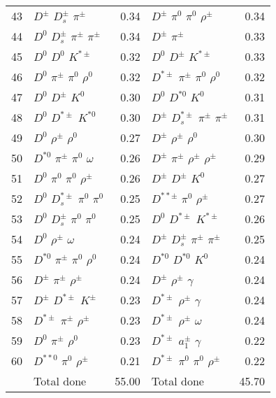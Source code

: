 \documentclass[6pt]{article}
\begin{document}
\begin{tabular}{rlr|lr}
43 & $D^{\pm}$ $D_s^{\pm}$ $\pi^{\pm}$ & 0.34 & $D^{\pm}$ $\pi^0$ $\pi^0$ $\rho^{\pm}$ & 0.34 \\
44 & $D^0$ $D_s^{\pm}$ $\pi^{\pm}$ $\pi^{\pm}$ & 0.34 & $D^{\pm}$ $\pi^{\pm}$ & 0.33 \\
45 & $D^0$ $D^0$ $K^{*\pm}$ & 0.32 & $D^0$ $D^{\pm}$ $K^{*\pm}$ & 0.33 \\
46 & $D^0$ $\pi^{\pm}$ $\pi^0$ $\rho^0$ & 0.32 & $D^{*\pm}$ $\pi^{\pm}$ $\pi^0$ $\rho^0$ & 0.32 \\
47 & $D^0$ $D^{\pm}$ $K^0$ & 0.30 & $D^0$ $D^{*0}$ $K^0$ & 0.31 \\
48 & $D^0$ $D^{*\pm}$ $K^{*0}$ & 0.30 & $D^{\pm}$ $D_s^{*\pm}$ $\pi^{\pm}$ $\pi^{\pm}$ & 0.31 \\
49 & $D^0$ $\rho^{\pm}$ $\rho^0$ & 0.27 & $D^{\pm}$ $\rho^{\pm}$ $\rho^0$ & 0.30 \\
50 & $D^{*0}$ $\pi^{\pm}$ $\pi^0$ $\omega$ & 0.26 & $D^{\pm}$ $\pi^{\pm}$ $\rho^{\pm}$ $\rho^{\pm}$ & 0.29 \\
51 & $D^0$ $\pi^0$ $\pi^0$ $\rho^{\pm}$ & 0.26 & $D^{\pm}$ $D^{\pm}$ $K^0$ & 0.27 \\
52 & $D^0$ $D_s^{*\pm}$ $\pi^0$ $\pi^0$ & 0.25 & $D^{**\pm}$ $\pi^0$ $\rho^{\pm}$ & 0.27 \\
53 & $D^0$ $D_s^{\pm}$ $\pi^0$ $\pi^0$ & 0.25 & $D^0$ $D^{*\pm}$ $K^{*\pm}$ & 0.26 \\
54 & $D^0$ $\rho^{\pm}$ $\omega$ & 0.24 & $D^{\pm}$ $D_s^{\pm}$ $\pi^{\pm}$ $\pi^{\pm}$ & 0.25 \\
55 & $D^{*0}$ $\pi^{\pm}$ $\pi^0$ $\rho^0$ & 0.24 & $D^{*0}$ $D^{*0}$ $K^0$ & 0.24 \\
56 & $D^{\pm}$ $\pi^{\pm}$ $\rho^{\pm}$ & 0.24 & $D^{\pm}$ $\rho^{\pm}$ $\gamma$ & 0.24 \\
57 & $D^{\pm}$ $D^{*\pm}$ $K^{\pm}$ & 0.23 & $D^{*\pm}$ $\rho^{\pm}$ $\gamma$ & 0.24 \\
58 & $D^{*\pm}$ $\pi^{\pm}$ $\rho^{\pm}$ & 0.23 & $D^{*\pm}$ $\rho^{\pm}$ $\omega$ & 0.24 \\
59 & $D^0$ $\pi^{\pm}$ $\rho^0$ & 0.23 & $D^{*\pm}$ $a_1^{\pm}$ $\gamma$ & 0.22 \\
60 & $D^{**0}$ $\pi^0$ $\rho^{\pm}$ & 0.21 & $D^{*\pm}$ $\pi^0$ $\pi^0$ $\rho^{\pm}$ & 0.22 \\
\hline & Total done & 55.00 & Total done & 45.70\\
\end{tabular}
\end{document}
